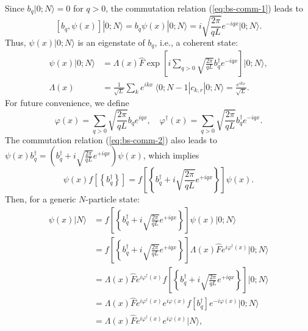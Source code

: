 \documentclass{SciPost}
\begin{document}
Since $b_q|0;N\rangle=0$ for $q>0$, the commutation relation (\ref{eq:bs-comm-1}) leads to 
\begin{equation*}
	\left[b_{q}, \psi(x)\right]|0;N\rangle = b_{q} \psi(x)|0;N\rangle = i\sqrt{\frac{2\pi}{qL}} e^{-iqx}|0;N\rangle.
\end{equation*}
Thus, $\psi(x)|0;N\rangle$ is an eigenstate of $b_q$, i.e., a coherent state:
\begin{equation*}
\begin{aligned}
	\psi(x)|0;N\rangle
	&= \Lambda(x) \hat F \exp\left[i\sum_{q>0} \sqrt{\frac{2\pi}{qL}} b_q^\dagger e^{-iqx}\right]|0;N\rangle,\\
	\Lambda(x) &= \frac{1}{\sqrt L}\sum_k e^{ikx}\ \langle 0;N-1| c_{k,r}|0;N\rangle 
	= \frac{e^{ik_F}}{\sqrt L}.
\end{aligned}
\end{equation*}
For future convenience, we define
\begin{equation*}
	\varphi(x) = \sum_{q>0} \sqrt{\frac{2\pi}{qL}} b_q e^{iqx},\quad
	\varphi^\dagger(x) = \sum_{q>0} \sqrt{\frac{2\pi}{qL}} b_q^\dagger e^{-iqx}.
\end{equation*}
The commutation relation (\ref{eq:bs-comm-2}) also leads to $\psi(x) b_{q}^{\dagger} =\left(b_{q}^{\dagger}+i\sqrt{\frac{2\pi}{qL}} e^{+iqx}\right) \psi(x)$, which implies
\begin{equation*}
	\psi(x) f\left[\left\{b_{q}^{\dagger}\right\}\right] 
	=f\left[\left\{b_{q}^{\dagger}+i\sqrt{\frac{2\pi}{qL}} e^{+iqx}\right\}\right] \psi(x).
\end{equation*}
Then, for a generic $N$-particle state:
\begin{equation*}
\begin{aligned}
	\psi(x)|N\rangle 
	&= f\left[\left\{b_{q}^{\dagger}+i\sqrt{\frac{2\pi}{qL}} e^{+iqx}\right\}\right] \psi(x)|0;N\rangle \\
	&= f\left[\left\{b_{q}^{\dagger}+i\sqrt{\frac{2\pi}{qL}} e^{+iqx}\right\}\right] \Lambda(x) \hat{F} e^{i\varphi^\dagger(x)}|0;N\rangle \\
	&= \Lambda(x) \hat{F} e^{i\varphi^\dagger(x)} f\left[\left\{b_{q}^{\dagger}+i\sqrt{\frac{2\pi}{qL}} e^{+iqx}\right\}\right]|0;N\rangle \\
	&= \Lambda(x) \hat{F} e^{i\varphi^\dagger(x)}e^{i\varphi(x)} f\left[b_{q}^{\dagger}\right] e^{-i\varphi(x)}|0;N\rangle \\
	&= \Lambda(x) \hat{F} e^{i\varphi^\dagger(x)} e^{i\varphi(x)}|N\rangle,
\end{aligned}
\end{equation*}
\end{document}
